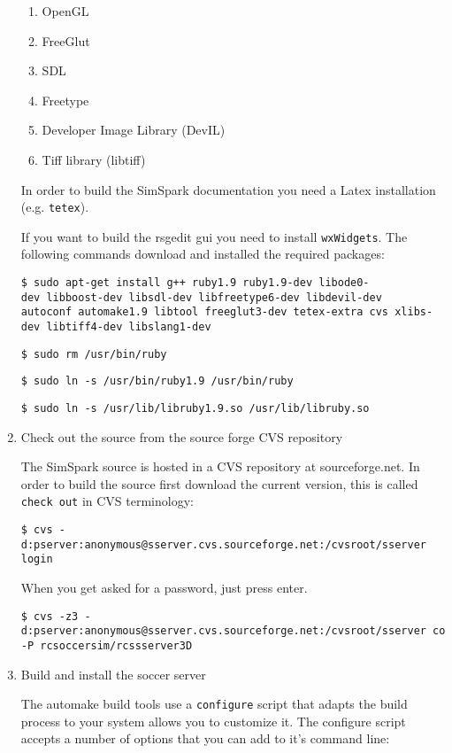 \begin{enumerate}
\begin{enumerate}
\item OpenGL
\item FreeGlut
\item SDL
\item Freetype
\item Developer Image Library (DevIL)
\item Tiff library (libtiff)
\end{enumerate}

In order to build the SimSpark documentation you need a Latex
installation (e.g. \texttt{tetex}).

If you want to build the rsgedit gui you need to install
\texttt{wxWidgets}. The following commands download and installed the required packages:

\texttt{\$ sudo apt-get install g++ ruby1.9 ruby1.9-dev libode0-dev\
libboost-dev libsdl-dev libfreetype6-dev libdevil-dev autoconf\
automake1.9 libtool freeglut3-dev tetex-extra cvs xlibs-dev\
libtiff4-dev libslang1-dev}

\texttt{\$ sudo rm /usr/bin/ruby}


\texttt{\$ sudo ln -s /usr/bin/ruby1.9 /usr/bin/ruby}


\texttt{\$ sudo ln -s /usr/lib/libruby1.9.so /usr/lib/libruby.so}

\item Check out the source from the source forge CVS repository

The SimSpark source is hosted in a CVS repository at
sourceforge.net. In order to build the source first download the
current version, this is called \texttt{check out} in CVS terminology:

\texttt{\$ cvs -d:pserver:anonymous@sserver.cvs.sourceforge.net:/cvsroot/sserver login}


When you get asked for a password, just press enter.


\texttt{\$ cvs -z3 -d:pserver:anonymous@sserver.cvs.sourceforge.net:/cvsroot/sserver co -P rcsoccersim/rcssserver3D}


\item Build and install the soccer server

The automake build tools use a \texttt{configure} script that adapts
the build process to your system allows you to customize it. The
configure script accepts a number of options that you can add to it's
command line:

\begin{enumerate}


\end{enumerate}
\end{enumerate}
